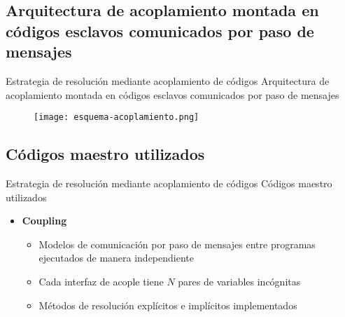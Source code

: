 \subsection{Arquitectura de acoplamiento montada en códigos esclavos comunicados por paso de mensajes}

\begin{frame}
{Estrategia de resolución mediante acoplamiento de códigos}
{Arquitectura de acoplamiento montada en códigos esclavos comunicados por paso de mensajes}

\begin{figure}
\centering{}
\texttt{[image: esquema-acoplamiento.png]}
\end{figure}


\end{frame}

\subsection{Códigos maestro utilizados}

\begin{frame}
{Estrategia de resolución mediante acoplamiento de códigos}
{Códigos maestro utilizados}

\begin{itemize}
\item \textbf{Coupling} \cite{coup-0d3d} \cite{coup-black} \cite{coup-hyd}
  \begin{itemize}
  \item <1-> Modelos de comunicación por paso de mensajes entre programas ejecutados de manera independiente
  \item <2-> Cada interfaz de acople tiene $N$ pares de variables incógnitas
  \item <3-> Métodos de resolución explícitos e implícitos implementados
  \end{itemize}
\end{itemize}

\end{frame}

